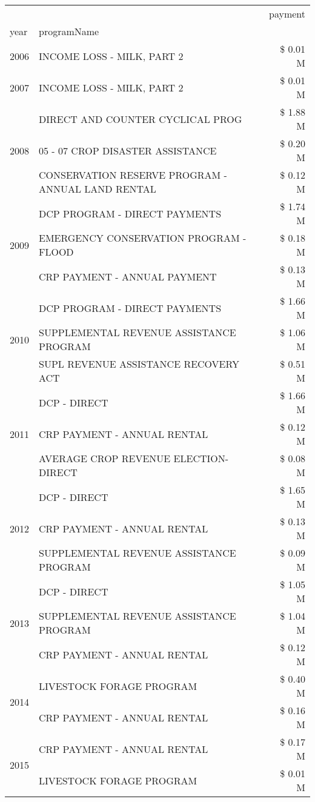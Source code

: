 \begin{tabular}{llr}
\toprule
 &  & payment \\
year & programName &  \\
\midrule
2006 & INCOME LOSS - MILK, PART 2 & \$ 0.01 M \\
\cline{1-3}
2007 & INCOME LOSS - MILK, PART 2 & \$ 0.01 M \\
\cline{1-3}
\multirow[t]{3}{*}{2008} & DIRECT AND COUNTER CYCLICAL PROG & \$ 1.88 M \\
 & 05 - 07 CROP DISASTER ASSISTANCE & \$ 0.20 M \\
 & CONSERVATION RESERVE PROGRAM - ANNUAL LAND RENTAL & \$ 0.12 M \\
\cline{1-3}
\multirow[t]{3}{*}{2009} & DCP PROGRAM - DIRECT PAYMENTS & \$ 1.74 M \\
 & EMERGENCY CONSERVATION PROGRAM - FLOOD & \$ 0.18 M \\
 & CRP PAYMENT - ANNUAL PAYMENT & \$ 0.13 M \\
\cline{1-3}
\multirow[t]{3}{*}{2010} & DCP PROGRAM - DIRECT PAYMENTS & \$ 1.66 M \\
 & SUPPLEMENTAL REVENUE ASSISTANCE PROGRAM & \$ 1.06 M \\
 & SUPL REVENUE ASSISTANCE RECOVERY ACT & \$ 0.51 M \\
\cline{1-3}
\multirow[t]{3}{*}{2011} & DCP - DIRECT & \$ 1.66 M \\
 & CRP PAYMENT - ANNUAL RENTAL & \$ 0.12 M \\
 & AVERAGE CROP REVENUE ELECTION-DIRECT & \$ 0.08 M \\
\cline{1-3}
\multirow[t]{3}{*}{2012} & DCP - DIRECT & \$ 1.65 M \\
 & CRP PAYMENT - ANNUAL RENTAL & \$ 0.13 M \\
 & SUPPLEMENTAL REVENUE ASSISTANCE PROGRAM & \$ 0.09 M \\
\cline{1-3}
\multirow[t]{3}{*}{2013} & DCP - DIRECT & \$ 1.05 M \\
 & SUPPLEMENTAL REVENUE ASSISTANCE PROGRAM & \$ 1.04 M \\
 & CRP PAYMENT - ANNUAL RENTAL & \$ 0.12 M \\
\cline{1-3}
\multirow[t]{2}{*}{2014} & LIVESTOCK FORAGE PROGRAM & \$ 0.40 M \\
 & CRP PAYMENT - ANNUAL RENTAL & \$ 0.16 M \\
\cline{1-3}
\multirow[t]{3}{*}{2015} & CRP PAYMENT - ANNUAL RENTAL & \$ 0.17 M \\
 & LIVESTOCK FORAGE PROGRAM & \$ 0.01 M \\

\end{tabular}
